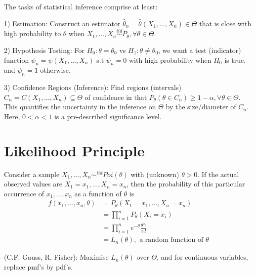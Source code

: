\documentclass[a4paper]{article}
\begin{document}
The tasks of statistical inference comprise at least:

1) Estimation: Construct an estimator $\hat{\theta}_{n} = \hat{\theta}\left( X_{1}, \ldots, X_{n} \right) \in  \Theta $ that is close with high probability to $\theta$ when $X_{1}, \ldots, X_{n} \stackrel{iid}{\sim} P_{\theta}, \forall \theta \in  \Theta$.

2) Hypothesis Testing: For $H_0 : \theta = \theta_{0} $ vs $H_1 : \theta \neq \theta_{0} $, we want a test (indicator) function $\psi_{n} = \psi \left( X_{1}, \ldots, X_{n} \right) $ s.t $\psi _{n} = 0$ with high probability when $H_{0}$ is true, and $\psi_{n} = 1$ otherwise.

3) Confidence Regions (Inference): Find regions (intervals) $C_{n} = C \left( X_{1}, \ldots, X_{n} \right) \subseteq   \Theta $ of confidence in that $P_{\theta} \left( \theta \in  C_{n} \right) \ge 1 - \alpha, \forall \theta \in  \Theta$. This quantifies the uncertainty in the inference on $\Theta$ by the size/diameter of $C_{n}$. Here, $0 < \alpha < 1$ is a pre-described significance level.

\section{Likelihood Principle}

\begin{eg}
        Consider a sample $X_{1}, \ldots, X_{n} \sim ^{iid} Poi\left( \theta \right) $ with (unknown) $\theta > 0$. If the actual observed values are  $X_{1} = x_{1}, \ldots, X_{n} = x_{n}$, then the probability of this particular occurrence of $x_{1}, \ldots, x_{n}$ as a function of $\theta$ is 
\begin{align*}
	f \left( x_{1}, \ldots, x_{n}, \theta \right) &= P_{\theta} \left( X_{1}=x_{1}, \ldots, X_{n} = x_{n} \right) \\
						    &= \prod_{i=1}^{n} P_{\theta} \left( X_{i} = x_{i} \right) \\
						    &= \prod_{i=1}^{n} e^{-\theta} \frac{\theta^{x_{i}}}{x_{i}!} \\
						    &= L_{n}\left( \theta \right), \textrm{ a random function of } \theta 
\end{align*} 
\end{eg}

\begin{remark}
	(C.F. Gauss, R. Fisher): 
	Maximise $L_{n}\left( \theta \right)$ over $\Theta$, and for continuous variables, replace pmf's by pdf's.
\end{remark}
\end{document}
